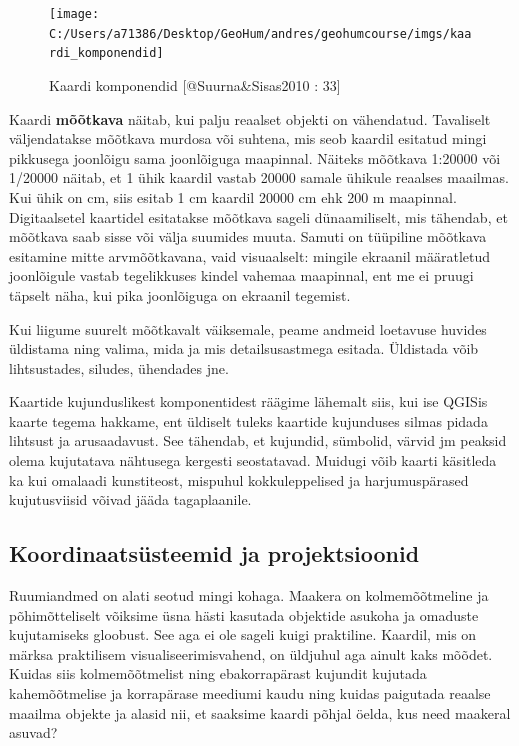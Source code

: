 \documentclass[
]{book}
\begin{document}
\begin{figure}

{\centering \texttt{[image: C:/Users/a71386/Desktop/GeoHum/andres/geohumcourse/imgs/kaardi\_komponendid]} 

}

\caption{Kaardi komponendid [@Suurna&Sisas2010 : 33]}\label{fig:kaardi-komponendid}
\end{figure}

Kaardi \textbf{mõõtkava} näitab, kui palju reaalset objekti on vähendatud. Tavaliselt väljendatakse mõõtkava murdosa või suhtena, mis seob kaardil esitatud mingi pikkusega joonlõigu sama joonlõiguga maapinnal. Näiteks mõõtkava 1:20000 või 1/20000 näitab, et 1 ühik kaardil vastab 20000 samale ühikule reaalses maailmas. Kui ühik on cm, siis esitab 1 cm kaardil 20000 cm ehk 200 m maapinnal. Digitaalsetel kaartidel esitatakse mõõtkava sageli dünaamiliselt, mis tähendab, et mõõtkava saab sisse või välja suumides muuta. Samuti on tüüpiline mõõtkava esitamine mitte arvmõõtkavana, vaid visuaalselt: mingile ekraanil määratletud joonlõigule vastab tegelikkuses kindel vahemaa maapinnal, ent me ei pruugi täpselt näha, kui pika joonlõiguga on ekraanil tegemist.

Kui liigume suurelt mõõtkavalt väiksemale, peame andmeid loetavuse huvides üldistama ning valima, mida ja mis detailsusastmega esitada. Üldistada võib lihtsustades, siludes, ühendades jne.

\hypertarget{htmlwidget-55d7087b91f42c73ed9d}{}
\begin{leaflet}

\end{leaflet}

Kaartide kujunduslikest komponentidest räägime lähemalt siis, kui ise QGISis kaarte tegema hakkame, ent üldiselt tuleks kaartide kujunduses silmas pidada lihtsust ja arusaadavust. See tähendab, et kujundid, sümbolid, värvid jm peaksid olema kujutatava nähtusega kergesti seostatavad. Muidugi võib kaarti käsitleda ka kui omalaadi kunstiteost, mispuhul kokkuleppelised ja harjumuspärased kujutusviisid võivad jääda tagaplaanile.

\hypertarget{koordinaatsuxfcsteemid-ja-projektsioonid}{%
\subsection{Koordinaatsüsteemid ja projektsioonid}\label{koordinaatsuxfcsteemid-ja-projektsioonid}}

Ruumiandmed on alati seotud mingi kohaga. Maakera on kolmemõõtmeline ja põhimõtteliselt võiksime üsna hästi kasutada objektide asukoha ja omaduste kujutamiseks gloobust. See aga ei ole sageli kuigi praktiline. Kaardil, mis on märksa praktilisem visualiseerimisvahend, on üldjuhul aga ainult kaks mõõdet. Kuidas siis kolmemõõtmelist ning ebakorrapärast kujundit kujutada kahemõõtmelise ja korrapärase meediumi kaudu ning kuidas paigutada reaalse maailma objekte ja alasid nii, et saaksime kaardi põhjal öelda, kus need maakeral asuvad?
\end{document}
